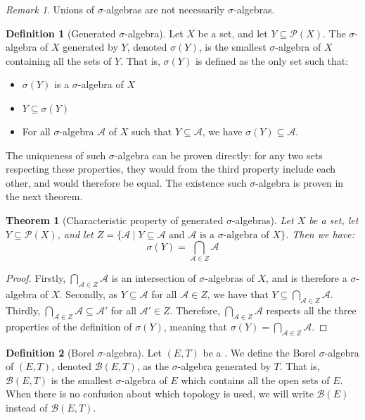 \documentclass{article}
\newtheorem{theorem}{Theorem}[section]
\theoremstyle{definition}
\newtheorem{definition}{Definition}[section]
\theoremstyle{remark}
\newtheorem*{remark}{Remark}
\theoremstyle{example}
\begin{document}
\begin{remark}
    Unions of $\sigma$-algebras are not necessarily $\sigma$-algebras.
\end{remark}

\begin{definition}[Generated $\sigma$-algebra]
    Let $X$ be a set, and let $Y \subseteq \mathcal{P}(X)$. The $\sigma$-algebra of $X$ generated by $Y$, denoted $\sigma(Y)$, is the smallest $\sigma$-algebra of $X$ containing all the sets of $Y$. That is, $\sigma(Y)$ is defined as the only set such that:
    \begin{itemize}
        \item $\sigma(Y)$ is a $\sigma$-algebra of $X$
        \item $Y \subseteq \sigma(Y)$
        \item For all $\sigma$-algebra $\mathcal{A}$ of $X$ such that $Y \subseteq \mathcal{A}$, we have $\sigma(Y) \subseteq \mathcal{A}$.
    \end{itemize}
    The uniqueness of such $\sigma$-algebra can be proven directly: for any two sets respecting these properties, they would from the third property include each other, and would therefore be equal. The existence such $\sigma$-algebra is proven in the next theorem.
\end{definition}

\begin{theorem}[Characteristic property of generated $\sigma$-algebras]
    Let $X$ be a set, let $Y \subseteq \mathcal{P}(X)$, and let $Z = \{\mathcal{A} \mid \text{$Y \subseteq \mathcal{A}$ and $\mathcal{A}$ is a $\sigma$-algebra of $X$}\}$. Then we have:
        $$\sigma(Y) = \bigcap_{\mathcal{A} \in Z} \mathcal{A}$$
\end{theorem}

\begin{proof}
    Firstly, $\bigcap_{\mathcal{A} \in Z} \mathcal{A}$ is an intersection of $\sigma$-algebras of $X$, and is therefore a $\sigma$-algebra of $X$. Secondly, as $Y \subseteq \mathcal{A}$ for all $\mathcal{A} \in Z$, we have that $Y \subseteq \bigcap_{\mathcal{A} \in Z} \mathcal{A}$. Thirdly, $\bigcap_{\mathcal{A} \in Z} \mathcal{A} \subseteq \mathcal{A}'$ for all $\mathcal{A}' \in Z$. Therefore, $\bigcap_{\mathcal{A} \in Z} \mathcal{A}$ respects all the three properties of the definition of $\sigma(Y)$, meaning that $\sigma(Y) = \bigcap_{\mathcal{A} \in Z} \mathcal{A}$.
\end{proof}

\begin{definition}[Borel $\sigma$-algebra]
    Let $(E, T)$ be a . We define the Borel $\sigma$-algebra of $(E, T)$, denoted $\mathcal{B}(E, T)$, as the $\sigma$-algebra generated by $T$. That is, $\mathcal{B}(E, T)$ is the smallest $\sigma$-algebra of $E$ which contains all the open sets of $E$. When there is no confusion about which topology is used, we will write $\mathcal{B}(E)$ instead of $\mathcal{B}(E, T)$.
\end{definition}
\end{document}
